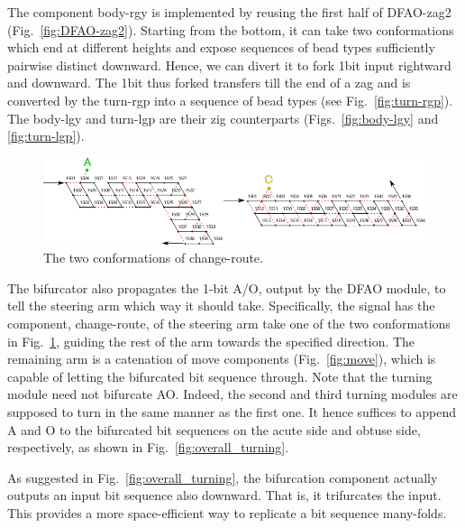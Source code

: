 The component body-rgy is implemented by reusing the first half of DFAO-zag2 (Fig.~\ref{fig:DFAO-zag2}). 
Starting from the bottom, it can take two conformations which end at different heights and expose sequences of bead types sufficiently pairwise distinct downward. 
Hence, we can divert it to fork 1bit input rightward and downward. 
The 1bit thus forked transfers till the end of a zag and is converted by the turn-rgp into a sequence of bead types (see Fig.~\ref{fig:turn-rgp}). 
The body-lgy and turn-lgp are their zig counterparts (Figs.~\ref{fig:body-lgy} and \ref{fig:turn-lgp}). 


\begin{figure}[h]
\centering
\includegraphics[width=\linewidth]{pic/change_route.pdf}
\caption{The two conformations of change-route.}
\label{fig:change_route}
\end{figure}

The bifurcator also propagates the 1-bit A/O, output by the DFAO module, to tell the steering arm which way it should take.
Specifically, the signal has the component, change-route, of the steering arm take one of the two conformations in Fig.~\ref{fig:change_route}, guiding the rest of the arm towards the specified direction.
The remaining arm is a catenation of move components (Fig.~\ref{fig:move}), which is capable of letting the bifurcated bit sequence through.  
Note that the turning module need not bifurcate AO.
Indeed, the second and third turning modules are supposed to turn in the same manner as the first one.
It hence suffices to append A and O to the bifurcated bit sequences on the acute side and obtuse side, respectively, as shown in Fig.~\ref{fig:overall_turning}.

\begin{remark}
As suggested in Fig.~\ref{fig:overall_turning}, the bifurcation component actually outputs an input bit sequence also downward.
That is, it trifurcates the input.
This provides a more space-efficient way to replicate a bit sequence many-folds.
\end{remark}

